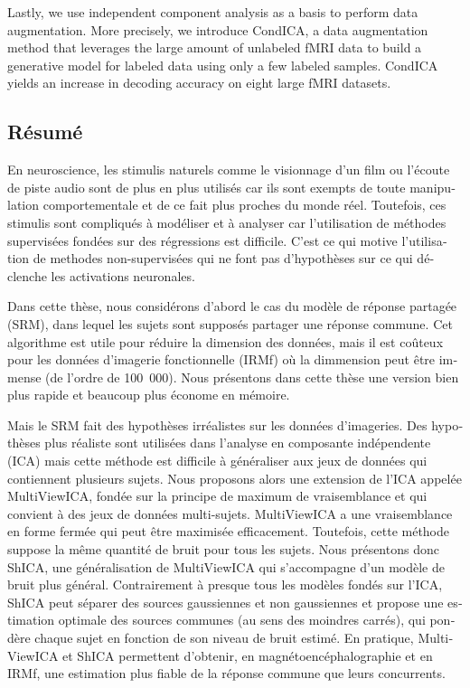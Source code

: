 Lastly, we use independent component analysis as a basis to perform data
augmentation.  More precisely, we introduce CondICA, a data augmentation method
that leverages the large amount of unlabeled fMRI data to build a generative
model for labeled data using only a few labeled samples. CondICA yields an
increase in decoding accuracy on eight large fMRI datasets.

\pagebreak 

\begin{otherlanguage}{french}
\chapter*{Résumé}
En neuroscience, les stimulis naturels comme le visionnage d'un film ou
l'écoute de piste audio sont de plus en plus utilisés car ils sont exempts de
toute manipulation comportementale et de ce fait plus proches du monde réel. 
Toutefois, ces stimulis sont compliqués à modéliser et à analyser car l'utilisation de
méthodes supervisées fondées sur des régressions est difficile.
C'est ce qui motive l'utilisation de methodes non-supervisées qui ne font pas
d'hypothèses sur ce qui déclenche les activations neuronales.

Dans cette thèse, nous considérons d'abord le cas du modèle de réponse partagée (SRM), dans lequel
les sujets sont supposés partager une réponse commune. Cet algorithme est utile pour
réduire la dimension des données, mais il est coûteux pour les données
d'imagerie fonctionnelle (IRMf) où la dimmension peut être immense (de l'ordre
de 100~000).
Nous présentons dans cette thèse une version bien plus rapide et beaucoup plus
économe en mémoire.

Mais le SRM fait des hypothèses irréalistes sur les données d'imageries. Des
hypothèses plus réaliste sont utilisées dans l'analyse en composante
indépendente (ICA) mais cette méthode est difficile à généraliser aux jeux de
données qui contiennent plusieurs sujets. Nous proposons alors une extension de
l'ICA  appelée MultiViewICA, fondée sur la principe de maximum de vraisemblance
et qui convient à des jeux de données multi-sujets.
MultiViewICA a une vraisemblance en forme fermée qui peut être maximisée
efficacement. Toutefois, cette méthode suppose la même quantité de bruit pour tous les sujets.
Nous présentons donc ShICA, une généralisation de MultiViewICA qui s'accompagne d'un modèle de bruit plus général.
Contrairement à presque tous les modèles fondés sur l'ICA, ShICA peut
séparer des sources gaussiennes et non gaussiennes et propose une estimation
optimale des sources communes (au sens des moindres carrés), qui pondère chaque
sujet en fonction de son niveau de bruit estimé.
En pratique, MultiViewICA et ShICA permettent d'obtenir, en magnétoencéphalographie et en IRMf, une estimation plus fiable de la réponse commune que leurs concurrents.


\end{otherlanguage}
